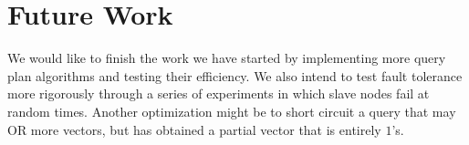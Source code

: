 \section{Future Work}
We would like to finish the work we have started by implementing more
query plan algorithms and testing their efficiency. We also intend to test
fault tolerance more rigorously through a series of experiments in which
slave nodes fail at random times. Another optimization might be to short circuit
a query that may OR more vectors, but has obtained a partial vector that
is entirely $1$'s.
